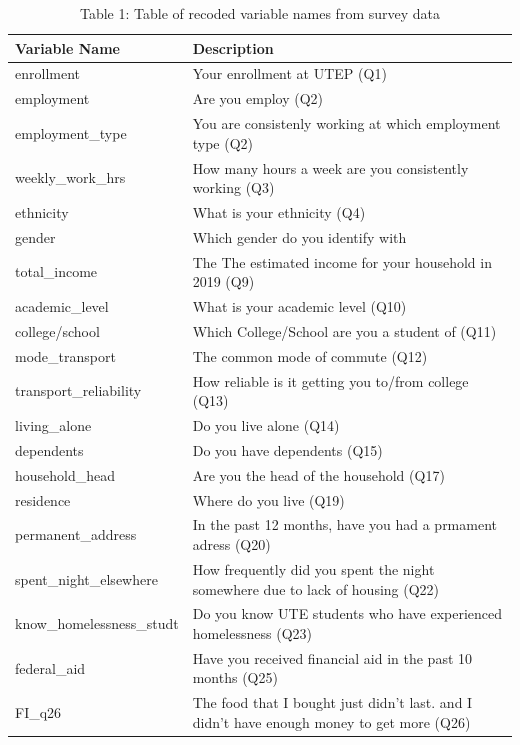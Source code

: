 \documentclass[
  10pt,
]{article}
\begin{document}
\begin{table}[H]

\caption{\label{tab:variables-description}Table 1: Table of recoded variable names from survey data}
\centering
\fontsize{12}{14}\selectfont
\begin{tabular}[t]{l|l}
\hline
Variable Name & Description\\
\hline
enrollment & Your enrollment at UTEP (Q1)\\
\hline
employment & Are you employ (Q2)\\
\hline
employment\_type & You are consistenly working at which employment type (Q2)\\
\hline
weekly\_work\_hrs & How many hours a week are you consistently working (Q3)\\
\hline
ethnicity & What is your ethnicity (Q4)\\
\hline
gender & Which gender do you identify with\\
\hline
total\_income & The The estimated income for your household in 2019 (Q9)\\
\hline
academic\_level & What is your academic level (Q10)\\
\hline
college/school & Which College/School are you a student of (Q11)\\
\hline
mode\_transport & The common mode of commute (Q12)\\
\hline
transport\_reliability & How reliable is it getting you to/from college (Q13)\\
\hline
living\_alone & Do you live alone (Q14)\\
\hline
dependents & Do you have dependents (Q15)\\
\hline
household\_head & Are you the head of the household (Q17)\\
\hline
residence & Where do you live (Q19)\\
\hline
permanent\_address & In the past 12 months, have you had a prmament adress (Q20)\\
\hline
spent\_night\_elsewhere & How frequently did you spent the night somewhere due to lack of housing (Q22)\\
\hline
know\_homelessness\_studt & Do you know UTE students who have experienced homelessness (Q23)\\
\hline
federal\_aid & Have you received financial aid in the past 10 months (Q25)\\
\hline
FI\_q26 & The food that I bought just didn't last. and I didn't have enough money to get more (Q26)\\

\end{tabular}
\end{table}
\end{document}
